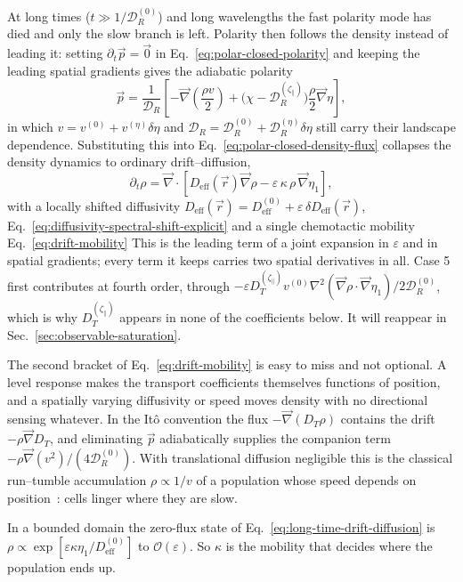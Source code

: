 \documentclass[
  reprint,
  superscriptaddress,
  amsmath,
  amssymb,
  aps,
  pre,
  nofootinbib,
  floatfix
]{revtex4-2}
\newcommand{\rv}{\vec r}
\newcommand{\pv}{\vec p}
\newcommand{\grad}{\vec{\nabla}}
\newcommand{\lap}{\nabla^2}
\newcommand{\ord}{\mathcal O}
\newcommand{\DR}{\mathcal D_R^{(0)}}
\newcommand{\zp}{\zeta_\parallel}
\begin{document}
At long times ($t\gg1/\DR$) and long wavelengths the fast polarity mode has
died and only the slow branch is left.  Polarity then follows the density
instead of leading it: setting $\partial_t\pv=\vec 0$ in
Eq.~\eqref{eq:polar-closed-polarity} and keeping the leading spatial gradients
gives the adiabatic polarity
\begin{equation}
 \pv=\frac{1}{\mathcal D_R}\left[-\grad\!\left(\frac{\rho v}{2}\right)
 +\bigl(\chi-\mathcal D_R^{(\zp)}\bigr)\frac{\rho}{2}\grad\eta\right],
 \label{eq:adiabatic-polarity}
\end{equation}
in which $v=v^{(0)}+v^{(\eta)}\delta\eta$ and
$\mathcal D_R=\DR+\mathcal D_R^{(\eta)}\delta\eta$ still carry their landscape
dependence.  Substituting this into
Eq.~\eqref{eq:polar-closed-density-flux} collapses the density dynamics to
ordinary drift--diffusion,
\begin{equation}
 \partial_t\rho=\grad\cdot\left[D_{\mathrm{eff}}(\rv)\grad\rho
 -\varepsilon\,\kappa\,\rho\,\grad\eta_1\right],
 \label{eq:long-time-drift-diffusion}
\end{equation}
with a locally shifted diffusivity
$D_{\mathrm{eff}}(\rv)=D_{\mathrm{eff}}^{(0)}+\varepsilon\,\delta D_{\mathrm{eff}}(\rv)$,
Eq.~\eqref{eq:diffusivity-spectral-shift-explicit}
and a single chemotactic mobility
Eq.~\eqref{eq:drift-mobility}
This is the leading term of a joint expansion in $\varepsilon$ and in spatial
gradients; every term it keeps carries two spatial derivatives in all.  Case 5
first contributes at fourth order, through
$-\varepsilon D_T^{(\zp)}v^{(0)}\lap(\grad\rho\cdot\grad\eta_1)/2\DR$, which
is why $D_T^{(\zp)}$ appears in none of the coefficients below.  It will
reappear in Sec.~\ref{sec:observable-saturation}.

The second bracket of Eq.~\eqref{eq:drift-mobility} is easy to miss and not
optional.  A level response makes the transport coefficients themselves
functions of position, and a spatially varying diffusivity or speed moves
density with no directional sensing whatever.  In the It\^o convention the
flux $-\grad(D_T\rho)$ contains the drift $-\rho\grad D_T$, and eliminating
$\pv$ adiabatically supplies the companion term $-\rho\grad(v^2)/(4\DR)$.
With translational diffusion negligible this is the classical run--tumble
accumulation $\rho\propto1/v$ of a population whose speed depends on
position~\cite{schnitzer1993,tailleur2008}: cells linger where they are slow.

In a bounded domain the zero-flux state of
Eq.~\eqref{eq:long-time-drift-diffusion} is
$\rho\propto\exp[\varepsilon\kappa\eta_1/D_{\mathrm{eff}}^{(0)}]$ to
$\ord(\varepsilon)$.  So $\kappa$ is the mobility that decides where the
population ends up.
\end{document}
